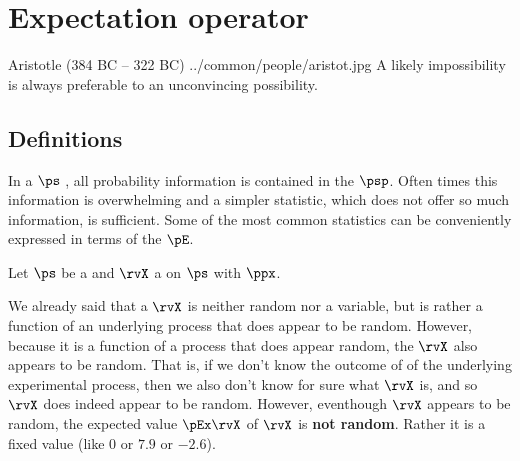 \chapter{Expectation operator}
\label{chp:stats}
\qboxnps
  {Aristotle (384 BC -- 322 BC)
    \footnotemark
  }
  {../common/people/aristot.jpg}
  {A likely impossibility is always preferable to an
  unconvincing possibility.}
\section{Definitions}
\label{sec:pE_defs}
In a  $\ps$ , all probability information
is contained in the  $\psp$.
Often times this information is overwhelming and a simpler statistic,
which does not offer so much information, is sufficient.
Some of the most common statistics can be conveniently expressed in terms
of the  $\pE$.
\begin{definition}
\label{def:pE}
Let $\ps$ be a   and
$\rvX$ a   on $\ps$ with
 $\ppx$.
\end{definition}

We already said that a  $\rvX$ is neither random nor a variable,
but is rather a function of an underlying process that does appear to be random.
However, because it is a function of a process that does appear random,
the  $\rvX$ also appears to be random.
That is, if we don't know the outcome of of the underlying experimental
process, then we also don't know for sure what $\rvX$ is, and so $\rvX$ does
indeed appear to be random.
However, eventhough $\rvX$ appears to be random,
the expected value $\pEx\rvX$  of $\rvX$ is {\bf not random}.
Rather it is a fixed value (like $0$ or $7.9$ or $-2.6$).

